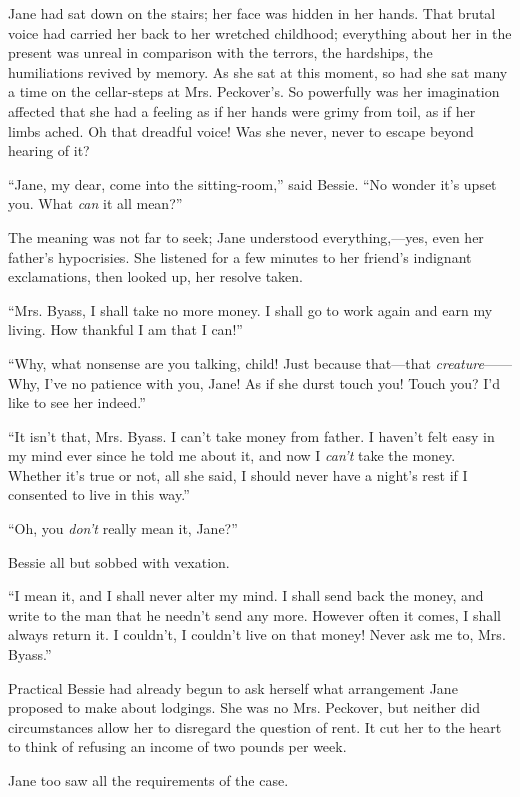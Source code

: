 Jane had sat down on the stairs; her face was hidden in her hands. That
brutal voice had carried her back to her wretched childhood; everything
about her in the present was unreal in comparison with the terrors, the
hardships, the humiliations revived by memory. As she sat at this
moment, so had she sat many a time on the cellar-steps at Mrs.
Peckover's. So powerfully was her imagination affected that she had a
feeling as {}if her hands were grimy from toil, as if her limbs ached.
Oh that dreadful voice! Was she never, never to escape beyond hearing of
it?

``Jane, my dear, come into the sitting-room,'' said Bessie. ``No wonder
it's upset you. What \emph{can} it all mean?''

The meaning was not far to seek; Jane understood everything,---yes, even
her father's hypocrisies. She listened for a few minutes to her friend's
indignant exclamations, then looked up, her resolve taken.

``Mrs. Byass, I shall take no more money. I shall go to work again and
earn my living. How thankful I am that I can!''

``Why, what nonsense are you talking, child! Just because that---that
\emph{creature}{{------}} Why, I've no patience with you, Jane! As if
she durst touch you! Touch you? I'd like to see her indeed.''

``It isn't that, Mrs. Byass. I can't take money from father. I haven't
felt easy in my mind ever since he told me about it, and now I
\emph{can't} take the money. Whether it's true or not, all she said, I
should never have a night's rest if I consented to live in this way.''

{}``Oh, you \emph{don't} really mean it, Jane?''

Bessie all but sobbed with vexation.

``I mean it, and I shall never alter my mind. I shall send back the
money, and write to the man that he needn't send any more. However often
it comes, I shall always return it. I couldn't, I couldn't live on that
money! Never ask me to, Mrs. Byass.''

Practical Bessie had already begun to ask herself what arrangement Jane
proposed to make about lodgings. She was no Mrs. Peckover, but neither
did circumstances allow her to disregard the question of rent. It cut
her to the heart to think of refusing an income of two pounds per week.

Jane too saw all the requirements of the case.


